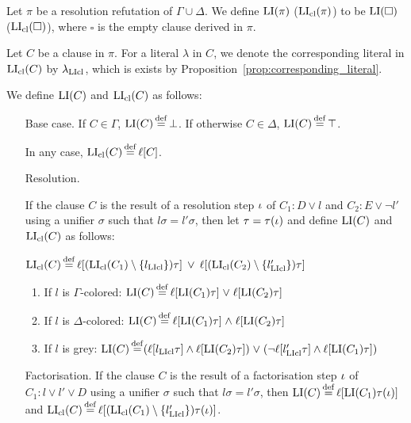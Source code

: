 \documentclass[,%
	draft=false,%
	numbers=noendperiod
	11pt,
	a4paper,
	oneside,%
	openany,
]{memoir}
\begin{document}
\begin{defi}
	Let $\pi$ be a resolution refutation of $\Gamma \cup \Delta$.
	We define $\operatorname{LI}(\pi)$ ($\operatorname{LI}_{\operatorname{cl}}(\pi)$) to be $\operatorname{LI}(\square)$ ($\operatorname{LI}_{\operatorname{cl}}(\square)$), where $\square$ is the empty clause derived in $\pi$.

	Let $C$ be a clause in $\pi$. 
	For a literal $\lambda$ in $C$, we denote the corresponding literal in $\operatorname{LI}_{\operatorname{cl}}(C)$ by $\lambda_{\operatorname{LIcl}}$, which is exists by Proposition~\ref{prop:corresponding_literal}.

	We define $\operatorname{LI}(C)$ and $\operatorname{LI}_{\operatorname{cl}}(C)$ as follows:

	\begin{itemize}
		\item[Base case.]
			If $C \in \Gamma$, $\operatorname{LI}(C) \operatorname{\stackrel{\mathrm{def}}{=}} \bot$.
			If otherwise $C \in \Delta$, $\operatorname{LI}(C) \operatorname{\stackrel{\mathrm{def}}{=}} \top$.

			In any case, $\operatorname{LI}_{\operatorname{cl}}(C) \operatorname{\stackrel{\mathrm{def}}{=}} \ell[C]$.
		\item[Resolution.]

			If the clause $C$ is the result of a resolution step $\iota$ of $C_1: D \lor l$ and $C_2: E \lor \lnot l'$ using a unifier $\sigma$ such that $l\sigma =  l'\sigma$, then let $\tau = \tau(\iota)$ and define $\operatorname{LI}(C)$ and $\operatorname{LI}_{\operatorname{cl}}(C)$ as follows:

			$\operatorname{LI}_{\operatorname{cl}}(C) \operatorname{\stackrel{\mathrm{def}}{=}} \ell[(\operatorname{LI}_{\operatorname{cl}}(C_1) \setminus \{l_{\operatorname{LIcl}}\})\tau] \;\,{\lor}\;\, \ell[(\operatorname{LI}_{\operatorname{cl}}(C_2)\setminus \{l_{\operatorname{LIcl}}'\})\tau] $

			\begin{enumerate}

				\item If $l$ is $\Gamma$-colored:
					$\operatorname{LI}(C) \operatorname{\stackrel{\mathrm{def}}{=}} \ell[\operatorname{LI}(C_1)\tau]\;{\lor}\; \ell[\operatorname{LI}(C_2)\tau] $

				\item If $l$ is $\Delta$-colored:
					$\operatorname{LI}(C) \operatorname{\stackrel{\mathrm{def}}{=}} \ell[\operatorname{LI}(C_1)\tau]\;{\land}\; \ell[\operatorname{LI}(C_2)\tau] $

				\item If $l$ is grey:
					$\operatorname{LI}(C) \operatorname{\stackrel{\mathrm{def}}{=}}
					(\ell[l_{\operatorname{LIcl}}\tau] \land \ell[\operatorname{LI}(C_2)\tau]) \;{\lor}\;
					(\lnot \ell[l'_{\operatorname{LIcl}}\tau]\land \ell[\operatorname{LI}(C_1)\tau ])
					$

			\end{enumerate}

		\item[Factorisation.]
			If the clause $C$ is the result of a factorisation step $\iota$ of $C_1: l \lor l' \lor D$ using a unifier $\sigma$ such that $l\sigma = l'\sigma$, then $\operatorname{LI}(C) \operatorname{\stackrel{\mathrm{def}}{=}} \ell[\operatorname{LI}(C_1)\tau(\iota)]$ and $\lifiboth{C} \defeq \lifboth{ (\lifiboth{C_1} \setminus\nolinebreak \{l'\cll\})\tau(\inference)}$.
			\qedhere

	\end{itemize}

\end{defi}
\end{document}
